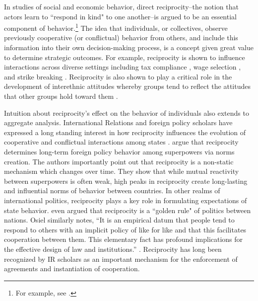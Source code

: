  In studies of social and economic behavior, direct reciprocity--the notion that actors learn to ``respond in kind" to one another--is argued to be an essential component of behavior.\footnote{For example, see \cite{bolton:1998, charness:2002, charness:2004, cox:2007, cox:2004}.} The idea that individuals, or collectives, observe previously cooperative (or conflictual) behavior from others, and include this information into their own decision-making process, is a concept given great value to determine strategic outcomes. For example, reciprocity is shown to influence interactions across diverse settings including tax compliance \citep{smith:1990}, wage selection \citep{campbell:1997}, and strike breaking \citep{brett:1998}. Reciprocity is also shown to play a critical role in the development of interethnic attitudes whereby groups tend to reflect the attitudes that other groups hold toward them \citep{berry:1979}. 

Intuition about reciprocity's effect on the behavior of individuals also extends to aggregate analysis. International Relations and foreign policy scholars have expressed a long standing interest in how reciprocity influences the evolution of cooperative and conflictual interactions among states \citep{richardson1960, keohane1989reciprocity}. \cite{rajmaira:1990} argue that reciprocity determines long-term foreign policy behavior among superpowers via norms creation. The authors importantly point out that reciprocity is a non-static mechanism which changes over time. They show that while mutual reactivity between superpowers is often weak, high peaks in reciprocity create long-lasting and influential norms of behavior between countries. In other realms of international politics, reciprocity plays a key role in formulating expectations of state behavior. \cite{ward1981} even argued that reciprocity is a ``golden rule" of politics between nations.  Osiel similarly notes, ``It is an empirical datum that people tend to respond to others with an implicit policy of like for like and that this facilitates cooperation between them. This elementary fact has profound implications for the effective design of law and institutions.'' \cite[p. 19]{osiel:2009}. Reciprocity has long been recognized by IR scholars as an important mechanism for the enforcement of agreements and instantiation of cooperation. 

